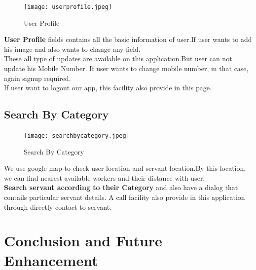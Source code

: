 \documentclass[twoside,a4paper,16pt]{book}
\begin{document}
\begin{itemize}
\begin{enumerate}
\begin{enumerate}
\vspace{0.6cm}

\begin{figure}[ht!]
\begin{center}
\texttt{[image: userprofile.jpeg]}
\caption{User Profile}
\end{center}
\end{figure}

 \vspace{0.2cm}

{\bf User Profile} fields contains all the basic information of user.If user wants to add his image and also wants to change any field.\\ 
These all type of updates are available on this application.But user can not update his Mobile Number. If user wants to change mobile number, in that case, again signup required.\\ 
If user want to logout our app, this facility also provide in this page.




\newpage
\section{Search By Category}

\vspace{0.6cm}

\begin{figure}[ht!]
\begin{center}
\texttt{[image: searchbycategory.jpeg]}
\caption{Search By Category}
\end{center}
\end{figure}

 \vspace{0.2cm}

We use google map to check user location and servant location.By this location, we can find nearest available workers and their distance with user.\\
{\bf Search servant according to their Category} and also have a dialog that contails particular servant details. A call facility also provide in this application through directly contact to servant.





 
\chapter{Conclusion and Future Enhancement}

\end{enumerate}
\end{enumerate}
\end{itemize}
\end{document}
